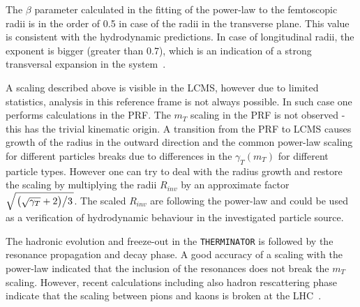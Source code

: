     The $\beta$ parameter calculated in the fitting of the power-law to the femtoscopic radii is in the order of 0.5 in case of the radii in the transverse plane.
    This value is consistent with the hydrodynamic predictions.
    In case of longitudinal radii, the exponent is bigger (greater than 0.7), which is an indication of a strong transversal expansion in the system~\cite{akkelin_sinyukov}.

    A scaling described above is visible in the LCMS, however due to limited statistics, analysis in this reference frame is not always possible.
    In such case one performs calculations in the PRF.
    The $m_T$ scaling in the PRF is not observed - this has the trivial kinematic origin.
    A transition from the PRF to LCMS causes growth of the radius in the outward direction and the common power-law scaling for different particles breaks due to differences in the $\gamma_T (m_T)$ for different particle types.
    However one can try to deal with the radius growth and restore the scaling by multiplying the radii $R_{inv}$ by an approximate factor $\sqrt{ \left. \left( \sqrt{\gamma_T} + 2 \right) \middle/ 3 \right. }$.
    The scaled $R_{inv}$ are following the power-law and could be used as a verification of hydrodynamic behaviour in the investigated particle source.

    The hadronic evolution and freeze-out in the \verb|THERMINATOR| is followed by the resonance propagation and decay phase.
    A good accuracy of a scaling with the power-law indicated that the inclusion of the resonances does not break the $m_T$ scaling.
    However, recent calculations including also hadron rescattering phase indicate that the scaling between pions and kaons is broken at the LHC~\cite{sinyukov_kaon}.
